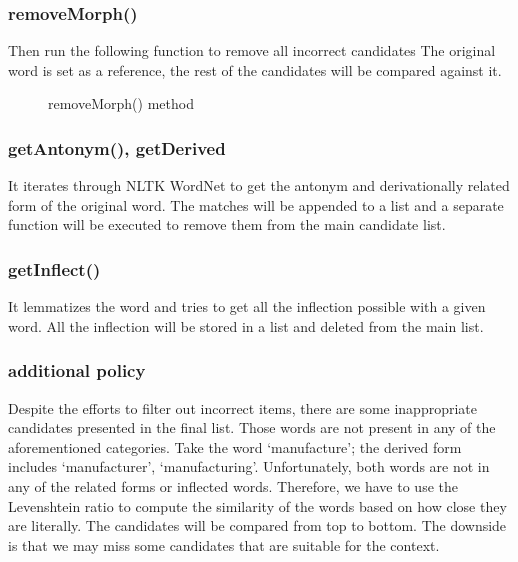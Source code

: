 \documentclass[12pt,oneside,openright,a4paper]{cpe-english-project}
\begin{document}
\subsubsection{removeMorph()}
Then run the following function to remove all incorrect candidates
The original word is set as a reference, the rest of the candidates will be compared against it.
\begin{figure}[!h]\centering
\setlength{\fboxrule}{0.2mm} %
\setlength{\fboxsep}{1cm}
\caption{removeMorph() method}\label{fig:removeMorph() method}
\end{figure}
\subsubsection{getAntonym(), getDerived}
It iterates through NLTK WordNet to get the antonym and derivationally related form of the original word. The matches will be appended to a list and a separate function will be executed to remove them from the main candidate list.

\subsubsection{getInflect()}
It lemmatizes the word and tries to get all the inflection possible with a given word. All the inflection will be stored in a list and deleted from the main list.

\subsubsection{additional policy}
Despite the efforts to filter out incorrect items, there are some inappropriate candidates presented in the final list. Those words are not present in any of the aforementioned categories. Take the word ‘manufacture’; the derived form includes ‘manufacturer’, ‘manufacturing’. Unfortunately, both words are not in any of the related forms or inflected words. Therefore, we have to use the Levenshtein ratio to compute the similarity of the words based on how close they are literally. The candidates will be compared from top to bottom. The downside is that we may miss some candidates that are suitable for the context.
\end{document}
